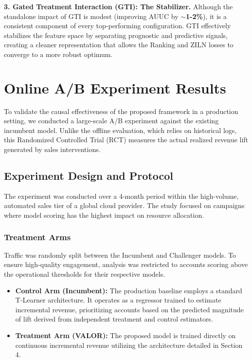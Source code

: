 \documentclass[runningheads]{llncs}
\begin{document}
\textbf{3. Gated Treatment Interaction (GTI): The Stabilizer.}
Although the standalone impact of GTI is modest (improving AUUC by \textbf{$\sim$1-2\%}), it is a consistent component of every top-performing configuration. GTI effectively stabilizes the feature space by separating prognostic and predictive signals, creating a cleaner representation that allows the Ranking and ZILN losses to converge to a more robust optimum.

\section{Online A/B Experiment Results}
To validate the causal effectiveness of the proposed framework in a production setting, we conducted a large-scale A/B experiment against the existing incumbent model. Unlike the offline evaluation, which relies on historical logs, this Randomized Controlled Trial (RCT) measures the actual realized revenue lift generated by sales interventions.

\subsection{Experiment Design and Protocol}
The experiment was conducted over a 4-month period within the high-volume, automated sales tier of a global cloud provider. The study focused on campaigns where model scoring has the highest impact on resource allocation.

\subsubsection{Treatment Arms}
Traffic was randomly split between the Incumbent and Challenger models. To ensure high-quality engagement, analysis was restricted to accounts scoring above the operational thresholds for their respective models.

\begin{itemize}
    \item \textbf{Control Arm (Incumbent):} The production baseline employs a standard T-Learner architecture. It operates as a regressor trained to estimate incremental revenue, prioritizing accounts based on the predicted magnitude of lift derived from independent treatment and control estimators.
    \item \textbf{Treatment Arm (VALOR):} The proposed model is trained directly on continuous incremental revenue utilizing the architecture detailed in Section 4. 
\end{itemize}
\end{document}
